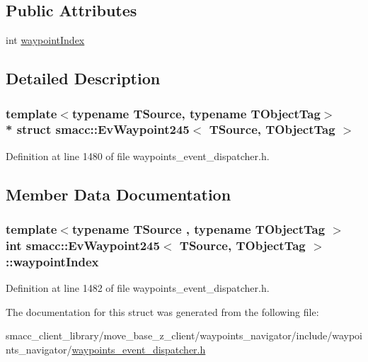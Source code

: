 \subsection*{Public Attributes}
\begin{DoxyCompactItemize}
\item 
int \hyperlink{structsmacc_1_1EvWaypoint245_a009777581849292cc52552ec71f4dca9}{waypoint\+Index}
\end{DoxyCompactItemize}


\subsection{Detailed Description}
\subsubsection*{template$<$typename T\+Source, typename T\+Object\+Tag$>$\\*
struct smacc\+::\+Ev\+Waypoint245$<$ T\+Source, T\+Object\+Tag $>$}



Definition at line 1480 of file waypoints\+\_\+event\+\_\+dispatcher.\+h.



\subsection{Member Data Documentation}
\subsubsection[{\texorpdfstring{waypoint\+Index}{waypointIndex}}]{\setlength{\rightskip}{0pt plus 5cm}template$<$typename T\+Source , typename T\+Object\+Tag $>$ int {\bf smacc\+::\+Ev\+Waypoint245}$<$ T\+Source, T\+Object\+Tag $>$\+::waypoint\+Index}\hypertarget{structsmacc_1_1EvWaypoint245_a009777581849292cc52552ec71f4dca9}{}\label{structsmacc_1_1EvWaypoint245_a009777581849292cc52552ec71f4dca9}


Definition at line 1482 of file waypoints\+\_\+event\+\_\+dispatcher.\+h.



The documentation for this struct was generated from the following file\+:\begin{DoxyCompactItemize}
\item 
smacc\+\_\+client\+\_\+library/move\+\_\+base\+\_\+z\+\_\+client/waypoints\+\_\+navigator/include/waypoints\+\_\+navigator/\hyperlink{waypoints__event__dispatcher_8h}{waypoints\+\_\+event\+\_\+dispatcher.\+h}\end{DoxyCompactItemize}

